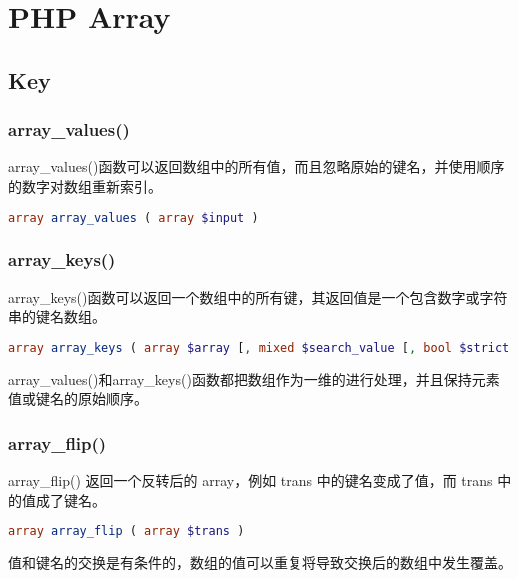 \chapter{PHP Array}


\section{Key}

\subsection{array\_values()}

array\_values()函数可以返回数组中的所有值，而且忽略原始的键名，并使用顺序的数字对数组重新索引。

\begin{lstlisting}[language=PHP]
array array_values ( array $input )
\end{lstlisting}

\subsection{array\_keys()}

array\_keys()函数可以返回一个数组中的所有键，其返回值是一个包含数字或字符串的键名数组。



\begin{lstlisting}[language=PHP]
array array_keys ( array $array [, mixed $search_value [, bool $strict = false ]] )
\end{lstlisting}


array\_values()和array\_keys()函数都把数组作为一维的进行处理，并且保持元素值或键名的原始顺序。


\subsection{array\_flip()}

array\_flip() 返回一个反转后的 array，例如 trans 中的键名变成了值，而 trans 中的值成了键名。


\begin{lstlisting}[language=PHP]
array array_flip ( array $trans )
\end{lstlisting}


值和键名的交换是有条件的，数组的值可以重复将导致交换后的数组中发生覆盖。

\begin{lstlisting}[language=PHP]

\end{lstlisting}

